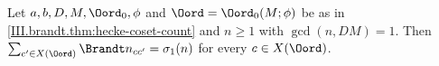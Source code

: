 Let $a,b,D,M,\Oord_0,\phi$ and $\Oord=\Oord_0(M;\phi)$ be as in \cref{III.brandt.thm:hecke-coset-count} and $n\ge1$ with $\gcd(n,DM)=1$.
Then $\sum_{c'\in X(\Oord)}\Brandt n_{cc'}=\sigma_1(n)$ for every $c\in X(\Oord)$.
